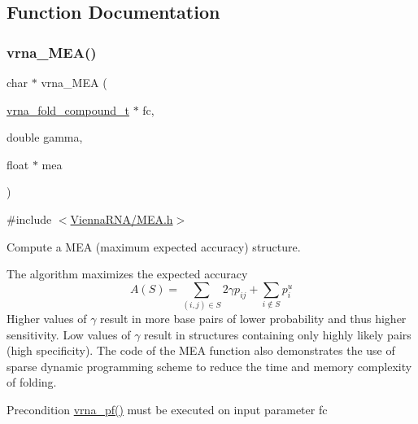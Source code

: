 \subsection{Function Documentation}
\mbox{\label{group__mea__fold_ga9b87b664ef014c1266aa50d5bc39f2ac}} 
\subsubsection{\texorpdfstring{vrna\_MEA()}{vrna\_MEA()}}
{\footnotesize\ttfamily char $\ast$ vrna\+\_\+\+M\+EA (\begin{DoxyParamCaption}\item[{\mbox{\hyperlink{group__fold__compound_ga1b0cef17fd40466cef5968eaeeff6166}{vrna\+\_\+fold\+\_\+compound\+\_\+t}} $\ast$}]{fc,  }\item[{double}]{gamma,  }\item[{float $\ast$}]{mea }\end{DoxyParamCaption})}



{\ttfamily \#include $<$\mbox{\hyperlink{MEA_8h}{Vienna\+R\+N\+A/\+M\+E\+A.\+h}}$>$}



Compute a M\+EA (maximum expected accuracy) structure. 

The algorithm maximizes the expected accuracy \[ A(S) = \sum_{(i,j) \in S} 2 \gamma p_{ij} + \sum_{i \notin S} p^u_i \] Higher values of $\gamma$ result in more base pairs of lower probability and thus higher sensitivity. Low values of $\gamma$ result in structures containing only highly likely pairs (high specificity). The code of the M\+EA function also demonstrates the use of sparse dynamic programming scheme to reduce the time and memory complexity of folding.

\begin{DoxyPrecond}{Precondition}
\mbox{\hyperlink{group__part__func__global_ga29e256d688ad221b78d37f427e0e99bc}{vrna\+\_\+pf()}} must be executed on input parameter {\ttfamily fc} 
\end{DoxyPrecond}

